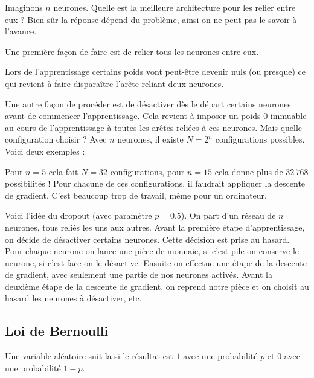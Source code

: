 \documentclass[11pt,class=report,crop=false]{standalone}
\begin{document}
Imaginons $n$ neurones. Quelle est la meilleure architecture pour les relier entre eux ?
Bien sûr la réponse dépend du problème, ainsi on ne peut pas le savoir à l'avance. 

Une première façon de faire est de relier tous les neurones entre eux.



Lors de l'apprentissage certains poids vont peut-être devenir nuls (ou presque) ce qui revient à faire disparaître l'arête reliant deux neurones.



Une autre façon de procéder est de désactiver dès le départ certains neurones avant de commencer l'apprentissage. Cela revient à imposer un poids $0$ immuable au cours de l'apprentissage à toutes les arêtes reliées à ces neurones.
Mais quelle configuration choisir ? Avec $n$ neurones, il existe $N = 2^n$ configurations possibles. Voici deux exemples :


Pour $n=5$ cela fait $N=32$ configurations, pour $n=15$ cela donne plus de $32\,768$ possibilités ! Pour chacune de ces configurations, il faudrait appliquer la descente de gradient. C'est beaucoup trop de travail, même pour un ordinateur.

Voici l'idée du dropout (avec paramètre $p=0.5$).
On part d'un réseau de $n$ neurones, tous reliés les uns aux autres.
Avant la première étape d'apprentissage, on décide de désactiver certains neurones.
Cette décision est prise au hasard. Pour chaque neurone on lance une pièce de monnaie, si c'est \og{}pile\fg{} on conserve le neurone, si c'est \og{}face\fg{} on le désactive. Ensuite on effectue une étape de la descente de gradient, avec seulement une partie de nos neurones activés. Avant la deuxième étape de la descente de gradient, on reprend notre pièce et on choisit au hasard les neurones à désactiver, etc.


\subsection{Loi de Bernoulli}

Une variable aléatoire suit la  si le résultat est $1$ avec une probabilité $p$ et $0$ avec une probabilité $1-p$.
\end{document}
